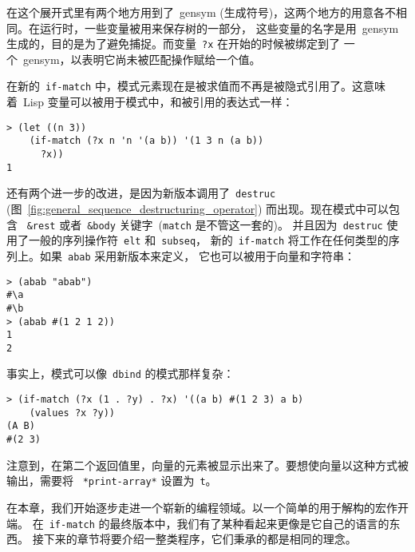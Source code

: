 在这个展开式里有两个地方用到了~gensym (生成符号)，这两个地方的用意各不相同。在运行时，一些变量被用来保存树的一部分，
这些变量的名字是用~gensym 生成的，目的是为了避免捕捉。而变量~\texttt{?x} 在开始的时候被绑定到了
一个~gensym，以表明它尚未被匹配操作赋给一个值。

在新的~\texttt{if-match} 中，模式元素现在是被求值而不再是被隐式引用了。这意味着~Lisp
变量可以被用于模式中，和被引用的表达式一样：
\begin{lstlisting}
> (let ((n 3))
    (if-match (?x n 'n '(a b)) '(1 3 n (a b))
      ?x))
1
\end{lstlisting}
还有两个进一步的改进，是因为新版本调用了~\texttt{destruc}
(图~\ref{fig:general_sequence_destructuring_operator}) 而出现。现在模式中可以包含
~\texttt{\&rest} 或者~\texttt{\&body} 关键字~(\texttt{match} 是不管这一套的)。
并且因为~\texttt{destruc} 使用了一般的序列操作符~\texttt{elt} 和~\texttt{subseq}，
新的~\texttt{if-match} 将工作在任何类型的序列上。如果~\texttt{abab} 采用新版本来定义，
它也可以被用于向量和字符串：
\begin{lstlisting}
> (abab "abab")
#\a
#\b
> (abab #(1 2 1 2))
1
2
\end{lstlisting}
事实上，模式可以像~\texttt{dbind} 的模式那样复杂：
\begin{lstlisting}
> (if-match (?x (1 . ?y) . ?x) '((a b) #(1 2 3) a b)
    (values ?x ?y))
(A B)
#(2 3)
\end{lstlisting}
注意到，在第二个返回值里，向量的元素被显示出来了。要想使向量以这种方式被输出，需要将
~\texttt{*print-array*} 设置为~\texttt{t}。

在本章，我们开始逐步走进一个崭新的编程领域。以一个简单的用于解构的宏作开端。
在~\texttt{if-match} 的最终版本中，我们有了某种看起来更像是它自己的语言的东西。
接下来的章节将要介绍一整类程序，它们秉承的都是相同的理念。

